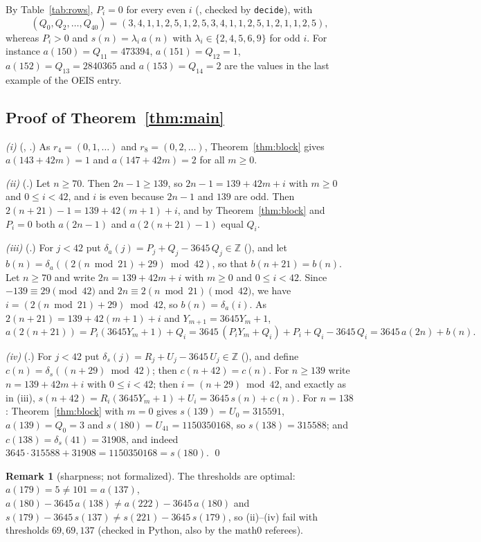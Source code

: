 \documentclass[11pt]{amsart}
\theoremstyle{plain}
\theoremstyle{definition}
\newtheorem{remark}[theorem]{Remark}
\newcommand{\Z}{\mathbb{Z}}
\begin{document}
By Table~\ref{tab:rows}, $P_i=0$ for every even $i$ (, checked by \texttt{decide}), with
\[
  (Q_0,Q_2,\dots,Q_{40})=(3,4,1,1,2,5,1,2,5,3,4,1,1,2,5,1,2,1,1,2,5),
\]
whereas $P_i>0$ and $s(n)=\lambda_i\,a(n)$ with $\lambda_i\in\{2,4,5,6,9\}$ for odd $i$.
For instance $a(150)=Q_{11}=473394$, $a(151)=Q_{12}=1$, $a(152)=Q_{13}=2840365$ and $a(153)=Q_{14}=2$ are the values in the last example of the OEIS entry.

\subsection{Proof of Theorem~\ref{thm:main}}

\emph{(i)} (, .) As $r_4=(0,1,\dots)$ and $r_8=(0,2,\dots)$, Theorem~\ref{thm:block} gives $a(143+42m)=1$ and $a(147+42m)=2$ for all $m\ge0$.

\emph{(ii)} (.) Let $n\ge70$. Then $2n-1\ge139$, so $2n-1=139+42m+i$ with $m\ge0$ and $0\le i<42$, and $i$ is even because $2n-1$ and $139$ are odd. Then $2(n+21)-1=139+42(m+1)+i$, and by Theorem~\ref{thm:block} and $P_i=0$ both $a(2n-1)$ and $a(2(n+21)-1)$ equal $Q_i$.

\emph{(iii)} (.) For $j<42$ put $\delta_a(j)=P_j+Q_j-3645\,Q_j\in\Z$ (), and let $b(n)=\delta_a((2(n\bmod 21)+29)\bmod 42)$, so that $b(n+21)=b(n)$. Let $n\ge70$ and write $2n=139+42m+i$ with $m\ge0$ and $0\le i<42$. Since $-139\equiv29\pmod{42}$ and $2n\equiv2(n\bmod21)\pmod{42}$, we have $i=(2(n\bmod21)+29)\bmod42$, so $b(n)=\delta_a(i)$. As $2(n+21)=139+42(m+1)+i$ and $Y_{m+1}=3645Y_m+1$,
\[
  a(2(n+21))=P_i(3645Y_m+1)+Q_i=3645\,(P_iY_m+Q_i)+P_i+Q_i-3645\,Q_i=3645\,a(2n)+b(n).
\]

\emph{(iv)} (.) For $j<42$ put $\delta_s(j)=R_j+U_j-3645\,U_j\in\Z$ (), and define $c(n)=\delta_s((n+29)\bmod42)$; then $c(n+42)=c(n)$.
For $n\ge139$ write $n=139+42m+i$ with $0\le i<42$; then $i=(n+29)\bmod42$, and exactly as in (iii), $s(n+42)=R_i(3645Y_m+1)+U_i=3645\,s(n)+c(n)$.
For $n=138$: Theorem~\ref{thm:block} with $m=0$ gives $s(139)=U_0=315591$, $a(139)=Q_0=3$ and $s(180)=U_{41}=1150350168$, so $s(138)=315588$; and $c(138)=\delta_s(41)=31908$, and indeed $3645\cdot315588+31908=1150350168=s(180)$. \qed

\begin{remark}[sharpness; not formalized]\label{rem:sharp}
The thresholds are optimal: $a(179)=5\ne101=a(137)$, $a(180)-3645\,a(138)\ne a(222)-3645\,a(180)$ and $s(179)-3645\,s(137)\ne s(221)-3645\,s(179)$, so (ii)--(iv) fail with thresholds $69,69,137$ (checked in Python, also by the math0 referees).
\end{remark}
\end{document}
